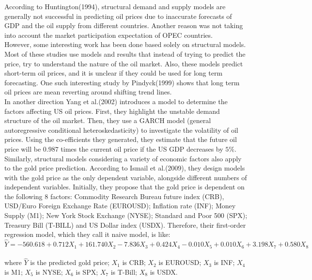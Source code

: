 \documentclass[runningheads]{llncs}
\begin{document}
\noindent According to Huntington(1994)\cite{huntington}, structural demand and supply models are generally not successful in predicting oil prices due to inaccurate forecasts of GDP and the oil supply from different countries. Another reason was not taking into account the market participation expectation of OPEC countries. \\

\noindent However, some interesting work has been done based solely on structural models. Most of these studies use models and results that instead of trying to predict the price, try to understand the nature of the oil market. Also, these models predict short-term oil prices, and it is unclear if they could be used for long term forecasting. One such interesting study by Pindyck(1999)\cite{pindyck} shows that long term oil prices are mean reverting around shifting trend lines. \\

\noindent In another direction Yang et al.(2002) \cite{yang} introduces a model to determine the factors affecting US oil prices. First, they highlight the unstable demand structure of the oil market. Then, they use a GARCH model (general autoregressive conditional heteroskedasticity) to investigate the volatility of oil prices. Using the co-efficients they generated, they estimate that the future oil price will be $0.987$ times the current oil price if the US GDP decreases by $5\%$. \\

\noindent Similarly, structural models considering a variety of economic factors also apply to the gold price prediction. According to Ismail et al.(2009)\cite{gold-Ismail}, they design models with the gold price as the only dependent variable, alongside different numbers of independent variables. Initially, they propose that the gold price is dependent on the following 8 factors: Commodity Research Bureau future index (CRB), USD/Euro Foreign Exchange Rate (EUROUSD); Inflation rate (INF); Money Supply (M1); New York Stock Exchange (NYSE); Standard and Poor 500 (SPX); Treasury Bill (T-BILL) and US Dollar index (USDX). Therefore, their first-order regression model, which they call it naive model, is like: \\

$\hat{Y}=-560.618+0.712X_1+161.740X_2-7.836X_3 +0.424X_4-0.010X_5+0.010X_6+3.198X_7+0.580X_8$ \\\\
where $\hat{Y}$ is the predicted gold price; $X_1$ is CRB; $X_2$ is EUROUSD; $X_3$ is INF; $X_4$ is M1; $X_5$ is NYSE; $X_6$ is SPX; $X_7$ is T-Bill; $X_8$ is USDX.\\
\end{document}
